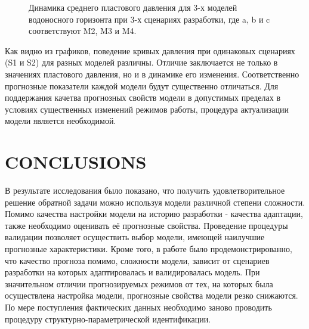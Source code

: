 \documentclass{article}
\begin{document}
\begin{figure}
{\begin{minipage}[h]{0.32\linewidth}
    \end{minipage} \hspace{0pt}
    \begin{minipage}[h]{0.32\linewidth}
    \end{minipage} 
    \caption{Динамика среднего пластового давления для 3-х моделей водоносного горизонта при 3-х сценариях разработки, где a, b и c соответствуют M2, M3 и M4.}
    \label{fig:2din}
    }
\end{figure}
Как видно из графиков, поведение кривых давления при одинаковых сценариях (S1 и S2) для разных моделей различны. Отличие заключается не только в значениях пластового давления, но и в динамике его изменения. Соответственно прогнозные показатели каждой модели будут существенно отличаться. Для поддержания качетва прогнозных свойств модели в допустимых пределах в условиях существенных изменений режимов работы, процедура актуализации модели является необходимой.

\section{CONCLUSIONS}

В результате исследования было показано, что получить удовлетворительное решение обратной задачи можно используя модели различной степени сложности. Помимо качества настройки модели на историю разработки - качества адаптации, также необходимо оценивать её прогнозные свойства. Проведение процедуры валидации позволяет осуществить выбор модели, имеющей наилучшие прогнозные характеристики. Кроме того, в работе было продемонстрированно, что качество прогноза помимо, сложности модели, зависит от сценариев разработки на которых адаптировалась и валидировалась модель. При  значительном отличии прогнозируемых режимов от тех, на которых была осуществлена настройка модели, прогнозные свойства модели резко снижаются. По мере поступления фактических данных необходимо заново проводить процедуру структурно-параметрической идентификации.
\end{document}

